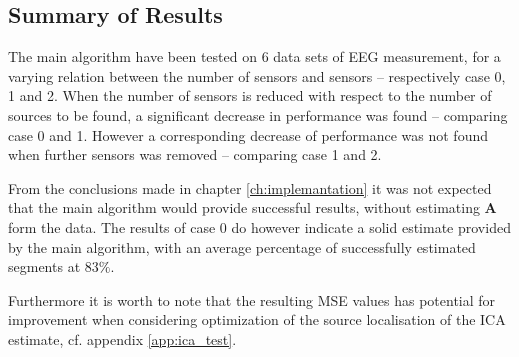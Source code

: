 \subsection{Summary of Results}
The main algorithm have been tested on 6 data sets of EEG measurement, for a varying relation between the number of sensors and sensors -- respectively case 0, 1 and 2.
When the number of sensors is reduced with respect to the number of sources to be found, a significant decrease in performance was found -- comparing case 0 and 1. 
However a corresponding decrease of performance was not found when further sensors was removed -- comparing case 1 and 2. 

From the conclusions made in chapter \ref{ch:implemantation} it was not expected that the main algorithm would provide successful results, without estimating $\textbf{A}$ form the data. The results of case 0 do however indicate a solid estimate provided by the main algorithm, with an average percentage of successfully estimated segments at $83\%$. 

Furthermore it is worth to note that the resulting MSE values has potential for improvement when considering optimization of the source localisation of the ICA estimate, cf. appendix \ref{app:ica_test}.





